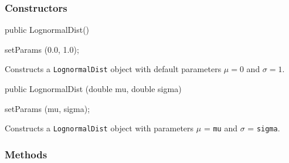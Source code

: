 \subsubsection* {Constructors}

\begin{code}

   public LognormalDist()\begin{hide} {
      setParams (0.0, 1.0);
   }\end{hide}
\end{code}
  \begin{tabb} Constructs a \texttt{LognormalDist} object with default
   parameters $\mu = 0$ and $\sigma = 1$.
  \end{tabb}
\begin{code}

   public LognormalDist (double mu, double sigma)\begin{hide} {
      setParams (mu, sigma);
   }\end{hide}
\end{code}
  \begin{tabb} Constructs a \texttt{LognormalDist} object with parameters
   $\mu$ = \texttt{mu} and $\sigma$ = \texttt{sigma}.
  \end{tabb}

\subsubsection* {Methods}

